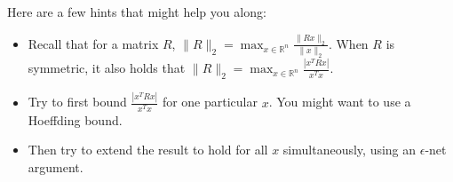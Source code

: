 \documentclass[10pt]{article}
\newcommand{\R}{\mathbb{R}}
\begin{document}
Here are a few hints that might help you along:
\begin{itemize}
	\item Recall that for a matrix $R$,  $\|R\|_2 = \max_{x \in \R^n} \frac{\|R x\|_2}{\|x\|_2}$. When $R$ is symmetric, it also holds that $\|R\|_2 = \max_{x \in \R^n} \frac{|x^T R x|}{x^Tx}$.
	\item Try to first bound $\frac{|x^T R x|}{x^Tx}$ for one particular $x$. You might want to use a {Hoeffding bound}.
	\item Then try to extend the result to hold for all $x$ simultaneously, using an $\epsilon$-net argument.
\end{itemize}

\end{document}
